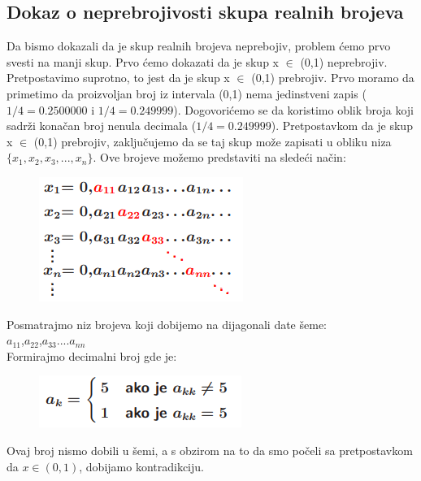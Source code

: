 \documentclass[a4paper]{article}
\begin{document}
\subsection{Dokaz o neprebrojivosti skupa realnih brojeva}
Da bismo dokazali da je skup realnih brojeva neprebojiv, problem ćemo prvo svesti na manji skup. 
Prvo ćemo dokazati da je skup x $\in$ (0,1) neprebrojiv.
\newline
Pretpostavimo suprotno, to jest da je skup x $\in$ (0,1) prebrojiv.
Prvo moramo da primetimo da proizvoljan broj iz intervala (0,1) nema jedinstveni zapis ($1/4=0.2500000$ i $1/4=0.249999$).
Dogovorićemo se da koristimo oblik broja koji sadrži konačan broj nenula decimala ($1/4=0.249999$).
Pretpostavkom da je skup x $\in$ (0,1) prebrojiv, zaključujemo da se taj skup može zapisati u obliku niza $\{x_{1},x_{2},x_{3},...,x_{n}\}$.
\newline
Ove brojeve možemo predstaviti na sledeći način:
 \begin{figure}[ht!]
    \begin{center}
    \includegraphics[scale=1.00]{tnp.png}
    \end{center}
    \end{figure}
\newpage
Posmatrajmo niz brojeva koji dobijemo na dijagonali date šeme:\\

$a_{11}$,$a_{22}$,$a_{33}$....$a_{nn}$\\

Formirajmo decimalni broj gde je:
\begin{figure}[ht!]
    \begin{center}
    \includegraphics[scale=1.30]{tnp2.png}
    \end{center}
    \end{figure}

Ovaj broj nismo dobili u šemi, a s obzirom na to da smo počeli sa pretpostavkom da $x \in (0,1)$, dobijamo kontradikciju.\\
\end{document}
